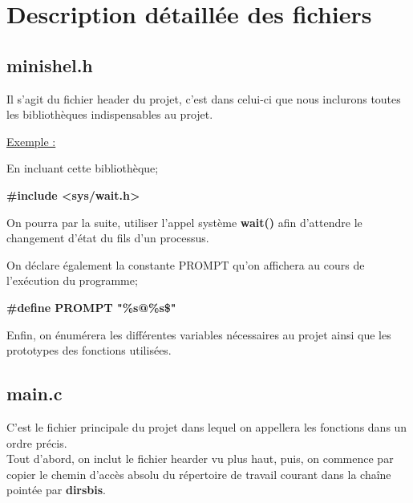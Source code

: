 \documentclass[11pt,a4paper]{report}
\begin{document}
\newpage
%
\section{Description détaillée des fichiers\\}
\subsection{minishel.h\\}

Il s'agit du fichier header du projet, c'est dans celui-ci que nous inclurons toutes les bibliothèques indispensables au projet.\\ \newline

\underline{Exemple :}\\ \newline

En incluant cette bibliothèque;\newline

\textbf{\#include <sys/wait.h>}\newline

On pourra par la suite, utiliser l'appel système \textbf{wait()} afin d'attendre le changement d'état du fils d'un processus.\newline

On déclare également la constante PROMPT qu'on affichera au cours de l'exécution du programme;\newline

\textbf{\#define PROMPT "\%s@\%s\$"}\newline

Enfin, on énumérera les différentes variables nécessaires au projet ainsi que les prototypes des fonctions utilisées.


\newpage
\subsection{main.c\\}
C'est le fichier principale du projet dans lequel on appellera les fonctions dans un ordre précis.\newline \\

Tout d'abord, on inclut le fichier hearder vu plus haut, puis, on commence par copier le chemin d'accès absolu du répertoire de travail courant dans la chaîne pointée par \textbf{dirsbis}.\newline
\end{document}

